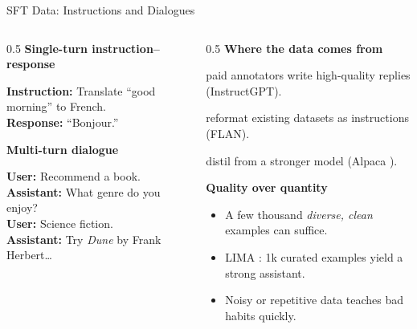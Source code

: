 \begin{frame}{SFT Data: Instructions and Dialogues}
  \begin{columns}[T]
    \begin{column}{0.5\textwidth}
      \textbf{Single-turn instruction--response}
      \begin{tcolorbox}[colback=gray!4, colframe=gray!40, boxrule=0.5pt, arc=2pt, left=4pt, right=4pt, top=2pt, bottom=2pt, fontupper=\scriptsize]
        \textbf{Instruction:} Translate ``good morning'' to French.\\[2pt]
        \textbf{Response:} ``Bonjour.''
      \end{tcolorbox}
      \textbf{Multi-turn dialogue}
      \begin{tcolorbox}[colback=gray!4, colframe=gray!40, boxrule=0.5pt, arc=2pt, left=4pt, right=4pt, top=2pt, bottom=2pt, fontupper=\scriptsize]
        \textbf{User:} Recommend a book.\\[1pt]
        \textbf{Assistant:} What genre do you enjoy?\\[1pt]
        \textbf{User:} Science fiction.\\[1pt]
        \textbf{Assistant:} Try \emph{Dune} by Frank Herbert\ldots
      \end{tcolorbox}
    \end{column}
    \begin{column}{0.5\textwidth}
      \textbf{Where the data comes from}
      \begin{description}[nosep]
        \item[Human-written:] paid annotators write high-quality replies (InstructGPT).
        \item[Curated NLP tasks:] reformat existing datasets as instructions (FLAN).
        \item[Model-generated:] distil from a stronger model (Alpaca \cite{taori2023alpaca}).
      \end{description}

      \vspace{0.4em}
      \textbf{Quality over quantity}
      \begin{itemize}[nosep]
        \item A few thousand \emph{diverse, clean} examples can suffice.
        \item LIMA \cite{zhou2023lima}: 1k curated examples yield a strong assistant.
        \item Noisy or repetitive data teaches bad habits quickly.
      \end{itemize}
    \end{column}
  \end{columns}
\end{frame}

